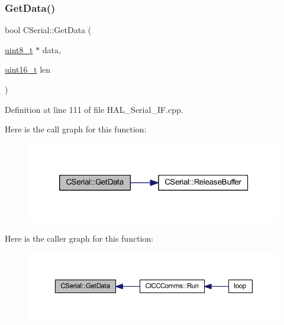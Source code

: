 \subsubsection{\texorpdfstring{Get\+Data()}{GetData()}}
{\footnotesize\ttfamily bool C\+Serial\+::\+Get\+Data (\begin{DoxyParamCaption}\item[{\mbox{\hyperlink{_a_d_a_s___types_8h_aba7bc1797add20fe3efdf37ced1182c5}{uint8\+\_\+t}} $\ast$}]{data,  }\item[{\mbox{\hyperlink{_a_d_a_s___types_8h_a1f1825b69244eb3ad2c7165ddc99c956}{uint16\+\_\+t}}}]{len }\end{DoxyParamCaption})}



Definition at line 111 of file H\+A\+L\+\_\+\+Serial\+\_\+\+I\+F.\+cpp.

Here is the call graph for this function\+:
\nopagebreak
\begin{figure}[H]
\begin{center}
\leavevmode
\includegraphics[width=320pt]{class_c_serial_abad86c07f530569b2ceeea75bda485ad_cgraph}
\end{center}
\end{figure}
Here is the caller graph for this function\+:
\nopagebreak
\begin{figure}[H]
\begin{center}
\leavevmode
\includegraphics[width=350pt]{class_c_serial_abad86c07f530569b2ceeea75bda485ad_icgraph}
\end{center}
\end{figure}
\mbox{\label{class_c_serial_a4327d6041fe9a390612b214709027cbb}} 
